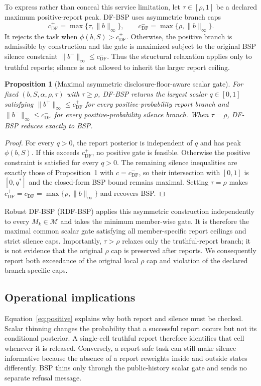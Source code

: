 \documentclass[review,11pt,times]{elsarticle}
\newtheorem{proposition}{Proposition}
\begin{document}
To express rather than conceal this service limitation, let $\tau\in[\rho,1]$ be a declared maximum positive-report peak. DF-BSP uses asymmetric branch caps
\begin{equation}
 c^+_{\mathrm{DF}}=\max\{\tau,\|b\|_\infty\},
 \qquad
 c^-_{\mathrm{DF}}=\max\{\rho,\|b\|_\infty\}.
 \label{eq:dfcap}
\end{equation}
It rejects the task when $\phi(b,S)>c^+_{\mathrm{DF}}$. Otherwise, the positive branch is admissible by construction and the gate is maximized subject to the original BSP silence constraint $\|b^-\|_\infty\le c^-_{\mathrm{DF}}$. Thus the structural relaxation applies only to truthful reports; silence is not allowed to inherit the larger report ceiling.

\begin{proposition}[Maximal asymmetric disclosure-floor-aware scalar gate]
For fixed $(b,S,\alpha,\rho,\tau)$ with $\tau\ge\rho$, DF-BSP returns the largest scalar $q\in[0,1]$ satisfying $\|b^+\|_\infty\le c^+_{\mathrm{DF}}$ for every positive-probability report branch and $\|b^-\|_\infty\le c^-_{\mathrm{DF}}$ for every positive-probability silence branch. When $\tau=\rho$, DF-BSP reduces exactly to BSP.
\end{proposition}
\begin{proof}
For every $q>0$, the report posterior is independent of $q$ and has peak $\phi(b,S)$. If this exceeds $c^+_{\mathrm{DF}}$, no positive gate is feasible. Otherwise the positive constraint is satisfied for every $q>0$. The remaining silence inequalities are exactly those of Proposition~1 with $c=c^-_{\mathrm{DF}}$, so their intersection with $[0,1]$ is $[0,q^*]$ and the closed-form BSP bound remains maximal. Setting $\tau=\rho$ makes $c^+_{\mathrm{DF}}=c^-_{\mathrm{DF}}=\max\{\rho,\|b\|_\infty\}$ and recovers BSP.
\end{proof}

Robust DF-BSP (RDF-BSP) applies this asymmetric construction independently to every $M_k\in\mathcal M$ and takes the minimum member-wise gate. It is therefore the maximal common scalar gate satisfying all member-specific report ceilings and strict silence caps. Importantly, $\tau>\rho$ relaxes only the truthful-report branch; it is not evidence that the original $\rho$ cap is preserved after reports. We consequently report both exceedance of the original local $\rho$ cap and violation of the declared branch-specific caps.

\subsection{Operational implications}
Equation~\eqref{eq:positive} explains why both report and silence must be checked. Scalar thinning changes the probability that a successful report occurs but not its conditional posterior. A single-cell truthful report therefore identifies that cell whenever it is released. Conversely, a report-safe task can still make silence informative because the absence of a report reweights inside and outside states differently. BSP thins only through the public-history scalar gate and sends no separate refusal message.
\end{document}
